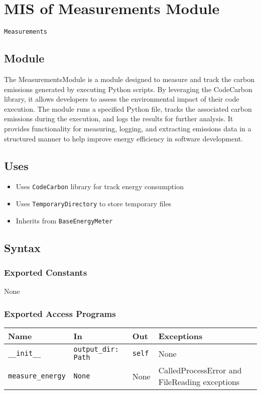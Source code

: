 \documentclass[12pt, titlepage]{article}
\begin{document}
\section{MIS of Measurements Module} \label{mis:measure}

\texttt{Measurements}

\subsection{Module}

The MeasurementsModule is a module designed to measure and track the carbon emissions generated by executing Python scripts. By leveraging the CodeCarbon library, it allows developers to assess the environmental impact of their code execution. The module runs a specified Python file, tracks the associated carbon emissions during the execution, and logs the results for further analysis. It provides functionality for measuring, logging, and extracting emissions data in a structured manner to help improve energy efficiency in software development.

\subsection{Uses}

\begin{itemize}
    \item Uses \texttt{CodeCarbon} library for track energy consumption
    \item Uses \texttt{TemporaryDirectory} to store temporary files
    \item Inherits from \texttt{BaseEnergyMeter}
\end{itemize}

\subsection{Syntax}

\subsubsection{Exported Constants}
None

\subsubsection{Exported Access Programs}

\begin{center}
\begin{tabularx}{\linewidth}{|l|>{\raggedright\arraybackslash}X|l|l|}
\hline
\textbf{Name} & \textbf{In} & \textbf{Out} & \textbf{Exceptions} \\
\hline
\texttt{\_\_init\_\_} & \texttt{output\_dir: Path} & \texttt{self} & None \\
\hline
\texttt{measure\_energy} & \texttt{None} & None & CalledProcessError and FileReading exceptions \\
\hline
\end{tabularx}
\end{center}
\end{document}
